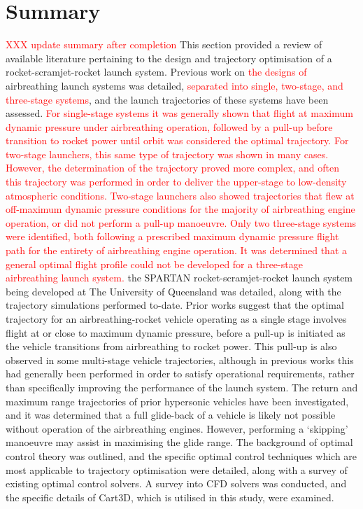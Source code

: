       \section{Summary}
\textcolor{red}{XXX update summary after completion}
This section provided a review of available literature pertaining to the design and trajectory optimisation of a rocket-scramjet-rocket launch system.    
       Previous work on \textcolor{red}{the designs of} airbreathing launch systems was detailed, \textcolor{red}{separated into single, two-stage, and three-stage systems}, and the launch trajectories of these systems have been assessed. \textcolor{red}{For single-stage systems it was generally shown that flight at maximum dynamic pressure under airbreathing operation, followed by a pull-up before transition to rocket power until orbit was considered the optimal trajectory. For two-stage launchers, this same type of trajectory was shown in many cases. However, the determination of the trajectory proved more complex, and often this trajectory was performed in order to deliver the upper-stage to low-density atmospheric conditions. Two-stage launchers also showed trajectories that flew at off-maximum dynamic pressure conditions for the majority of airbreathing engine operation, or did not perform a pull-up manoeuvre. Only two three-stage systems were identified, both following a prescribed maximum dynamic pressure flight path for the entirety of airbreathing engine operation. It was determined that a general optimal flight profile could not be developed for a three-stage airbreathing launch system.}
       the SPARTAN rocket-scramjet-rocket launch system being developed at The University of Queensland was detailed, along with the trajectory simulations performed to-date.
       Prior works suggest that the optimal trajectory for an airbreathing-rocket vehicle operating as a single stage involves flight at or close to maximum dynamic pressure, before a pull-up is initiated as the vehicle transitions from airbreathing to rocket power. This pull-up is also observed in some multi-stage vehicle trajectories, although in previous works this had generally been performed in order to satisfy operational requirements, rather than specifically improving the performance of the launch system. 
       The return and maximum range trajectories of prior hypersonic vehicles have been investigated, and it was determined that a full glide-back of a vehicle is likely not possible without operation of the airbreathing engines. However, performing a `skipping' manoeuvre may assist in maximising the glide range. 
The background of optimal control theory was outlined, and the specific optimal control techniques which are most applicable to trajectory optimisation were detailed, along with a survey of existing optimal control solvers. 
A survey into CFD solvers was conducted, and the specific details of Cart3D, which is utilised in this study, were examined. 
